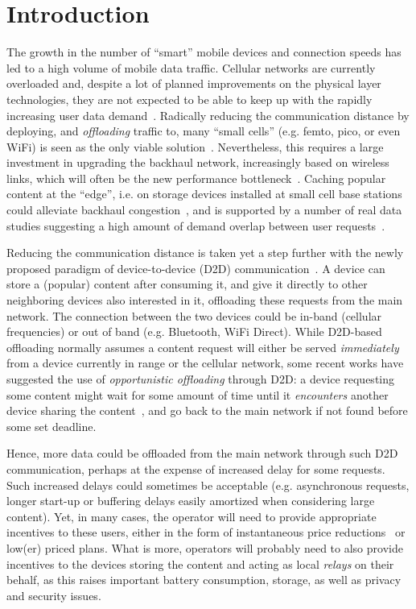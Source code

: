 \documentclass[10pt,conference,letterpaper]{IEEEtran}
\begin{document}
\section{Introduction}
The growth in the number of ``smart'' mobile devices and connection speeds has led to a high volume of mobile data traffic. Cellular networks are currently overloaded and, despite a lot of planned improvements on the physical layer technologies, they are not expected to be able to keep up with the rapidly increasing user data demand~\cite{cisco2014}. Radically reducing the communication distance by deploying, and \emph{offloading} traffic to, many ``small cells'' (e.g. femto, pico, or even WiFi) is seen as the only viable solution~\cite{femtocell-survey,HetNets-paradigm,Offloading-Wifi}. Nevertheless, this requires a large investment in upgrading the backhaul network, increasingly based on wireless links, which will often be the new performance bottleneck~\cite{femtocaching}. Caching popular content at the ``edge'', i.e. on storage devices installed at small cell base stations could alleviate backhaul congestion~\cite{femtocaching,poularakis-video-HetNets}, and is supported by a number of real data studies suggesting a high amount of demand overlap between user requests~\cite{youtube-traffic-from-edge,top-video-cellular,pptv-mobile-vod}.

Reducing the communication distance is taken yet a step further with the newly proposed paradigm of device-to-device (D2D) communication~\cite{survey-d2d,caire-d2d-caching-limits}. A device can store a (popular) content after consuming it, and give it directly to other neighboring devices also interested in it, offloading these requests from the main network. The connection between the two devices could be in-band (cellular frequencies) or out of band (e.g. Bluetooth, WiFi Direct). While D2D-based offloading normally assumes a content request will either be served \emph{immediately} from a device currently in range or the cellular network, some recent works have suggested the use of \emph{opportunistic offloading} through D2D: a device requesting some content might wait for some amount of time until it \emph{encounters} another device sharing the content~\cite{multiple-offloading,fluid-limit-mass2012,offloading-control-theory}, and go back to the main network if not found before some set deadline. 

Hence, more data could be offloaded from the main network through such D2D communication, perhaps at the expense of increased delay for some requests. Such increased delays could sometimes be acceptable (e.g. asynchronous requests, longer start-up or buffering delays easily amortized when considering large content). Yet, in many cases, the operator will need to provide appropriate incentives to these users, either in the form of instantaneous price reductions~\cite{tube} or low(er) priced plans. What is more, operators will probably need to also provide incentives to the devices storing the content and acting as local \emph{relays} on their behalf, as this raises important battery consumption, storage, as well as privacy and security issues. 
\end{document}
